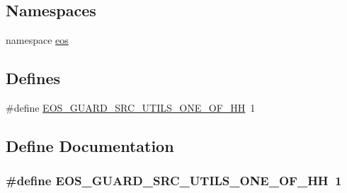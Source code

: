 \subsection*{Namespaces}
\begin{DoxyCompactItemize}
\item 
namespace \hyperlink{namespaceeos}{eos}
\end{DoxyCompactItemize}
\subsection*{Defines}
\begin{DoxyCompactItemize}
\item 
\#define \hyperlink{one-of_8hh_a10085f9ae6e432b67c7cf4d66bb54174}{EOS\_\-GUARD\_\-SRC\_\-UTILS\_\-ONE\_\-OF\_\-HH}~1
\end{DoxyCompactItemize}


\subsection{Define Documentation}
\hypertarget{one-of_8hh_a10085f9ae6e432b67c7cf4d66bb54174}{
\subsubsection[{EOS\_\-GUARD\_\-SRC\_\-UTILS\_\-ONE\_\-OF\_\-HH}]{\setlength{\rightskip}{0pt plus 5cm}\#define EOS\_\-GUARD\_\-SRC\_\-UTILS\_\-ONE\_\-OF\_\-HH~1}}
\label{one-of_8hh_a10085f9ae6e432b67c7cf4d66bb54174}

